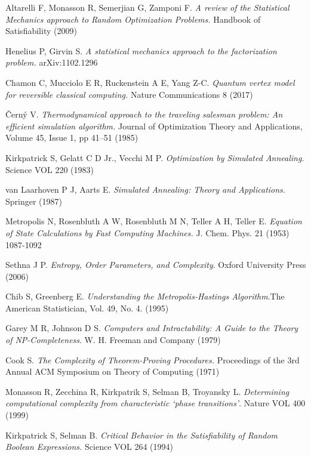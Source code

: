 \begin{thebibliography}{9}
  Altarelli F, Monasson R, Semerjian G, Zamponi F.
  \textit{A review of the Statistical Mechanics approach to Random Optimization Problems.} Handbook of Satisfiability (2009)

  Henelius P, Girvin S.
  \textit{A statistical mechanics approach to the factorization problem.} arXiv:1102.1296

  Chamon C, Mucciolo E R, Ruckenstein A E, Yang Z-C. \textit{Quantum vertex model for reversible classical computing.} Nature Communications 8 (2017)

  Černý V. \textit{Thermodynamical approach to the traveling salesman problem: An efficient simulation algorithm.} Journal of Optimization Theory and Applications, Volume 45, Issue 1, pp 41–51 (1985)

  Kirkpatrick S, Gelatt C D Jr., Vecchi M P. \textit{Optimization by Simulated Annealing}. Science VOL 220 (1983)

  van Laarhoven P J, Aarts E. \textit{Simulated Annealing: Theory and Applications.} Springer (1987)

  Metropolis N, Rosenbluth A W, Rosenbluth  M N, Teller A H, Teller E. \textit{Equation of State Calculations by Fast Computing Machines.} J. Chem. Phys. 21 (1953) 1087-1092

  Sethna J P.
  \textit{Entropy, Order Parameters, and Complexity}. Oxford University Press (2006)

  Chib S, Greenberg E. \textit{Understanding the Metropolis-Hastings Algorithm}.The American Statistician, Vol. 49, No. 4. (1995)

  Garey M R, Johnson D S. \textit{Computers and Intractability: A Guide to the Theory of NP-Completeness}. W. H. Freeman and Company (1979)

  Cook S. \textit{The Complexity of Theorem-Proving Procedures.} Proceedings of the 3rd Annual ACM Symposium on Theory of Computing (1971)

  Monasson R, Zecchina R, Kirkpatrik S, Selman B, Troyansky L.
  \textit{Determining computational complexity from characteristic `phase transitions'}. Nature VOL 400 (1999)

  Kirkpatrick S, Selman B. \textit{Critical Behavior in the Satisfiability of Random Boolean Expressions.} Science VOL 264 (1994)


\end{thebibliography}
